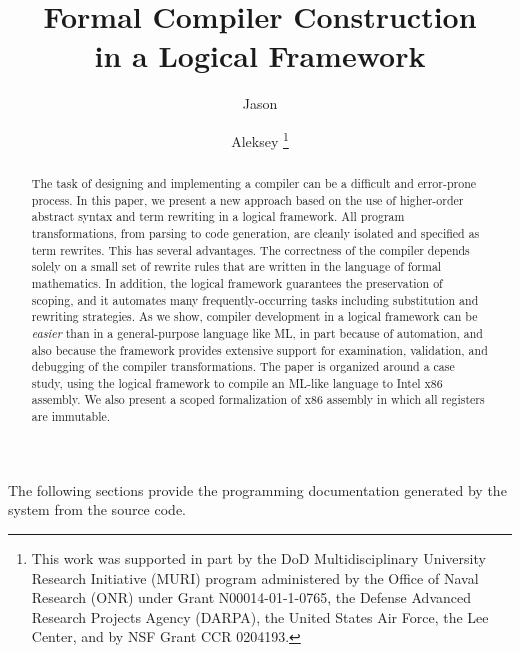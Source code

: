\documentclass[numreferences]{kluwer}
\begin{document}
\begin{article}
\begin{opening}

\title{Formal Compiler Construction\\ in a Logical Framework}

\author{Jason \footnotemark\addtocounter{footnote}{-1}}
\author{Aleksey \thanks{This
  work was supported in part by the DoD Multidisciplinary
  University Research Initiative (MURI) program administered by the
  Office of Naval Research (ONR) under Grant N00014-01-1-0765, the
  Defense Advanced Research Projects Agency (DARPA), the United States
  Air Force, the Lee Center, and by NSF Grant CCR 0204193.}}


\begin{abstract}
The task of designing and implementing a compiler can be a
difficult and error-prone process.  In this paper, we present a new
approach based on the use of higher-order abstract syntax and term
rewriting in a logical framework.  All program transformations, from
parsing to code generation, are cleanly isolated and specified as term
rewrites.  This has several advantages.  The correctness of the
compiler depends solely on a small set of rewrite rules that are
written in the language of formal mathematics.  In addition, the logical
framework guarantees the preservation of scoping, and it automates
many frequently-occurring tasks including substitution and rewriting
strategies.  As we show, compiler development in a logical framework
can be \emph{easier} than in a general-purpose language like ML, in
part because of automation, and also because the framework provides
extensive support for examination, validation, and debugging of the
compiler transformations.  The paper is organized around a case study,
using the \MetaPRL{} logical framework to compile an ML-like language to
Intel x86 assembly.  We also present a scoped formalization of x86
assembly in which all registers are immutable.

\end{abstract}
\end{opening}
\renewcommand\floatpagefraction{1.0}






\appendix

The following sections provide the programming documentation
generated by the \MetaPRL{} system from the source code.



\end{article}
\end{document}
